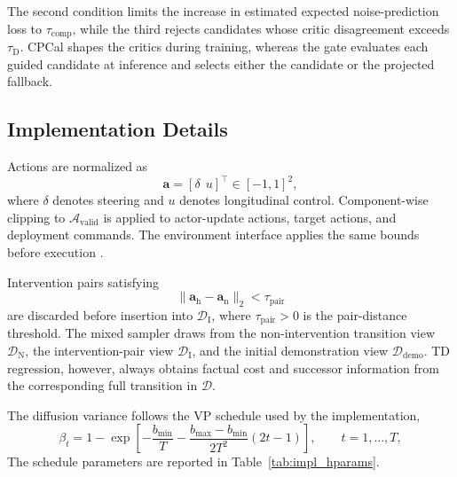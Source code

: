 \documentclass[9pt,journal]{IEEEtran}
\newcommand{\D}{\mathcal{D}}
\newcommand{\DI}{\mathcal{D}_{\mathrm{I}}}
\newcommand{\DN}{\mathcal{D}_{\mathrm{N}}}
\newcommand{\Ddemo}{\mathcal{D}_{\mathrm{demo}}}
\newcommand{\Avalid}{\mathcal{A}_{\mathrm{valid}}}
\newcommand{\va}{\bm{a}}
\newcommand{\vah}{\ensuremath{\va_{\mathrm h}}}      %
\newcommand{\van}{\ensuremath{\va_{\mathrm n}}}      %
\begin{document}
The second condition limits the increase in estimated
expected noise-prediction loss to $\tau_{\mathrm{comp}}$,
while the third rejects candidates whose critic
disagreement exceeds $\tau_{\mathrm D}$. CPCal shapes
the critics during training, whereas the gate evaluates
each guided candidate at inference and selects either
the candidate or the projected fallback.


\subsection{Implementation Details}
\label{sec:impl}

Actions are normalized as
\begin{equation*}
    \va
    =
    [\delta\ \ u]^\top
    \in[-1,1]^2,
\end{equation*}
where $\delta$ denotes steering and $u$ denotes
longitudinal control. Component-wise clipping to
$\Avalid$ is applied to actor-update actions, target
actions, and deployment commands. The environment
interface applies the same bounds before execution .

Intervention pairs satisfying
\begin{equation*}
    \|\vah-\van\|_2
    <
    \tau_{\mathrm{pair}}
\end{equation*}
are discarded before insertion into $\DI$, where
$\tau_{\mathrm{pair}}>0$ is the pair-distance threshold. The mixed
sampler draws from the non-intervention transition view $\DN$, the
intervention-pair view $\DI$, and the initial demonstration view
$\Ddemo$. TD regression, however, always obtains factual cost and
successor information from the corresponding full transition in $\D$.

The diffusion variance follows the VP schedule used by the implementation,
\begin{equation}
    \beta_t
    =
    1-
    \exp\!\left[
    -\frac{b_{\min}}{T}
    -
    \frac{b_{\max}-b_{\min}}{2T^2}(2t-1)
    \right],
    \qquad
    t=1,\ldots,T,
    \label{eq:vp_schedule}
\end{equation}
The schedule parameters are reported in
Table~\ref{tab:impl_hparams}.
\end{document}
